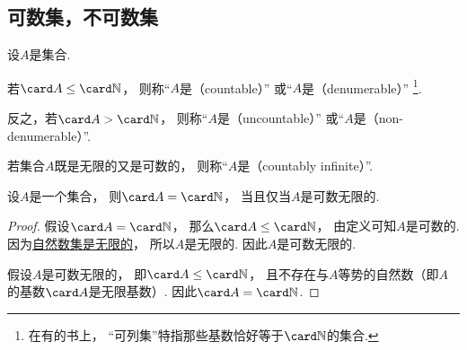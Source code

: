 \subsection{可数集，不可数集}
\begin{definition}
设\(A\)是集合.

若\(
	\card A \leq \card\mathbb{N}
\)，
则称“\(A\)是（countable）”
或“\(A\)是（denumerable）”
\footnote{
	在有的书上，
	“可列集”特指那些基数恰好等于\(\card\mathbb{N}\)的集合.
}.

反之，若\(
	\card A > \card\mathbb{N}
\)，
则称“\(A\)是（uncountable）”
或“\(A\)是（non-denumerable）”.
\end{definition}

\begin{definition}
若集合\(A\)既是无限的又是可数的，
则称“\(A\)是（countably infinite）”.
\end{definition}

\begin{proposition}
设\(A\)是一个集合，
则\(\card A = \card\mathbb{N}\)，
当且仅当\(A\)是可数无限的.
\begin{proof}
假设\(\card A = \card\mathbb{N}\)，
那么\(\card A \leq \card\mathbb{N}\)，
由定义可知\(A\)是可数的.
因为\hyperref[theorem:集合论.鸽巢原理.推论3]{自然数集是无限的}，
所以\(A\)是无限的.
因此\(A\)是可数无限的.

假设\(A\)是可数无限的，
即\(\card A \leq \card\mathbb{N}\)，
且不存在与\(A\)等势的自然数（即\(A\)的基数\(\card A\)是无限基数）.
因此\(\card A = \card\mathbb{N}\).
\end{proof}
\end{proposition}

